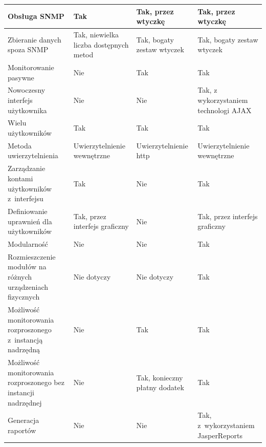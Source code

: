 \begin{longtable}[c]{|p{4.5cm}||p{3cm}|p{3cm}|p{3cm}|}
  \raggedright{Obsługa SNMP} & \raggedright{Tak} &
  \raggedright{Tak, przez wtyczkę} & \raggedright{Tak, przez wtyczkę}
  \tabularnewline
  \hline

  \raggedright{Zbieranie danych spoza SNMP} & \raggedright{Tak, niewielka liczba dostępnych metod} &
  \raggedright{Tak, bogaty zestaw wtyczek} & \raggedright{Tak, bogaty zestaw wtyczek}
  \tabularnewline
  \hline

  \raggedright{Monitorowanie pasywne} & \raggedright{Nie} &
  \raggedright{Tak} & \raggedright{Tak}
  \tabularnewline
  \hline

  \raggedright{Nowoczesny interfejs użytkownika} & \raggedright{Nie} &
  \raggedright{Nie} & \raggedright{Tak, z wykorzystaniem technologi AJAX}
  \tabularnewline
  \hline

  \raggedright{Wielu użytkowników} & \raggedright{Tak} &
  \raggedright{Tak} & \raggedright{Tak}
  \tabularnewline
  \hline

  \raggedright{Metoda uwierzytelnienia} & \raggedright{Uwierzytelnienie wewnętrzne} &
  \raggedright{Uwierzytelnienie http} & \raggedright{Uwierzytelnienie wewnętrzne}
  \tabularnewline
  \hline

  \raggedright{Zarządzanie kontami użytkowników z~interfejsu} & \raggedright{Tak} &
  \raggedright{Nie} & \raggedright{Tak}
  \tabularnewline
  \hline

  \raggedright{Definiowanie uprawnień dla użytkowników} & \raggedright{Tak, przez interfejs graficzny} &
  \raggedright{Nie} & \raggedright{Tak, przez interfejs graficzny}
  \tabularnewline
  \hline

  \raggedright{Modularność} & \raggedright{Nie} &
  \raggedright{Nie} & \raggedright{Tak}
  \tabularnewline
  \hline

  \raggedright{Rozmieszczenie modułów na różnych urządzeniach fizycznych} & \raggedright{Nie dotyczy} &
  \raggedright{Nie dotyczy} & \raggedright{Tak}
  \tabularnewline
  \hline

  \raggedright{Możliwość monitorowania rozproszonego z~instancją
    nadrzędną} & \raggedright{Nie} & \raggedright{Tak} &
  \raggedright{Tak}
  \tabularnewline
  \hline

  \raggedright{Możliwość monitorowania rozproszonego bez instancji nadrzędnej} & \raggedright{Nie} &
  \raggedright{Tak, konieczny płatny dodatek} & \raggedright{Tak}
  \tabularnewline
  \hline

  \raggedright{Generacja raportów} & \raggedright{Nie} &
  \raggedright{Nie} & \raggedright{Tak, z~wykorzystaniem JasperReports}
  \tabularnewline
  \hline


\end{longtable}
